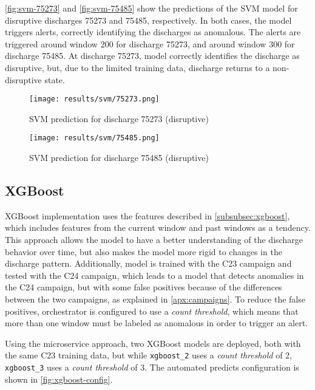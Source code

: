 \autoref{fig:svm-75273} and \autoref{fig:svm-75485} show the predictions of the \ac{SVM} model for disruptive discharges 75273 and 75485, respectively. In both cases, the model triggers alerts, correctly identifying the discharges as anomalous. The alerts are triggered around window 200 for discharge 75273, and around window 300 for discharge 75485. At discharge 75273, model correctly identifies the discharge as disruptive, but, due to the limited training data, discharge returns to a non-disruptive state.  

\begin{figure}[H]
    \centering
    \texttt{[image: results/svm/75273.png]}
    \caption{SVM prediction for discharge 75273 (disruptive)}
    \label{fig:svm-75273}
\end{figure}

\begin{figure}[H]
    \centering
    \texttt{[image: results/svm/75485.png]}
    \caption{SVM prediction for discharge 75485 (disruptive)}
    \label{fig:svm-75485}
\end{figure}

\subsection{XGBoost}

XGBoost implementation uses the features described in \autoref{subsubsec:xgboost}, which includes features from the current window and past windows as a tendency. This approach allows the model to have a better understanding of the discharge behavior over time, but also makes the model more rigid to changes in the discharge pattern. Additionally, model is trained with the C23 campaign and tested with the C24 campaign, which leads to a model that detects anomalies in the C24 campaign, but with some false positives because of the differences between the two campaigns, as explained in \autoref{apx:campaigns}. To reduce the false positives, orchestrator is configured to use a \textit{count threshold}, which means that more than one window must be labeled as anomalous in order to trigger an alert. 

Using the microservice approach, two XGBoost models are deployed, both with the same C23 training data, but while \texttt{xgboost\_2} uses a \textit{count threshold} of 2, \texttt{xgboost\_3} uses a \textit{count threshold} of 3. The automated predicts configuration is shown in \autoref{fig:xgboost-config}.

